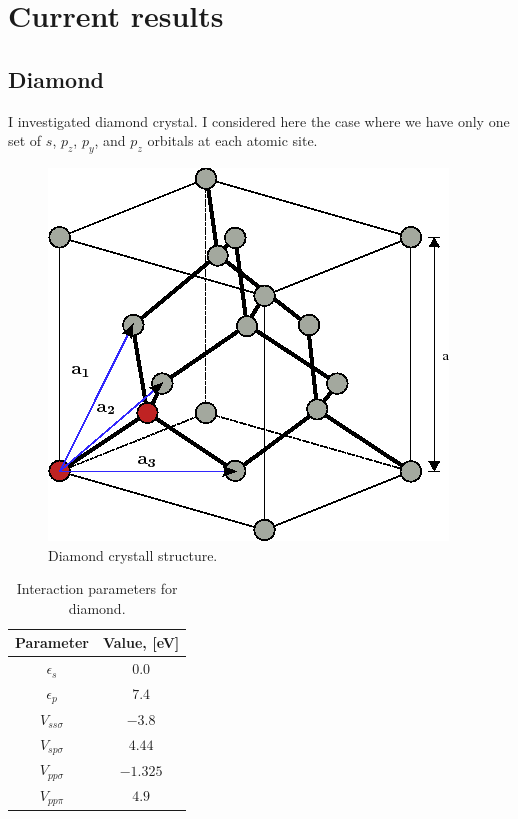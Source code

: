 \chapter{Current results}\label{r:results}
\section{Diamond}
I investigated diamond crystal. I considered here the case where we have only one set of $s$, $p_z$, $p_y$, and $p_z$ orbitals at each
atomic site.
\begin{figure}[h] 
 \begin{center}
  \includegraphics[width=0.3\linewidth]{img/diamond_crystall}
  \caption{Diamond crystall structure.}
 \end{center}
\end{figure}

\begin{table}[h]
 \begin{center}
  \begin{tabular}{|c|c|}
  \hline
    Parameter&Value, [eV]\\ \hline
    $\epsilon_s$ & $0.0$ \\ \hline
    $\epsilon_p$ & $7.4$ \\ \hline
    $V_{ss \sigma}$ & $-3.8$  \\ \hline
    $V_{sp \sigma}$ & $4.44$\\ \hline
    $V_{pp \sigma}$ & $-1.325$ \\ \hline
    $V_{pp \pi}$ &  $4.9$\\ \hline
  \end{tabular}
 \end{center}
  \caption{Interaction parameters for diamond.}
\end{table}

